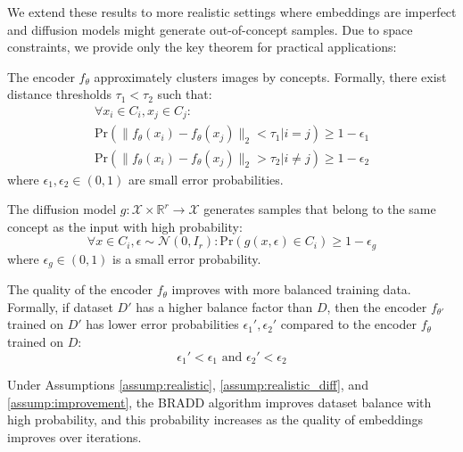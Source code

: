 \noindent
We extend these results to more realistic settings where embeddings are imperfect and diffusion models might generate out-of-concept samples. Due to space constraints, we provide only the key theorem for practical applications:


\begin{assumption}
\label{assump:realistic}
The encoder $f_\theta$ approximately clusters images by concepts. Formally, there exist distance thresholds $\tau_1 < \tau_2$ such that:
\begin{align}
\forall x_i \in C_i, x_j \in C_j: \\
\mathrm{Pr}(\|f_\theta(x_i) - f_\theta(x_j)\|_2 < \tau_1 | i = j) \geq 1 - \epsilon_1 \\
\mathrm{Pr}(\|f_\theta(x_i) - f_\theta(x_j)\|_2 > \tau_2 | i \neq j) \geq 1 - \epsilon_2
\end{align}
where $\epsilon_1, \epsilon_2 \in (0,1)$ are small error probabilities.
\end{assumption}

\begin{assumption}
\label{assump:realistic_diff}
The diffusion model $g: \mathcal{X} \times \mathbb{R}^r \rightarrow \mathcal{X}$ generates samples that belong to the same concept as the input with high probability:
\begin{equation}
\forall x \in C_i, \epsilon \sim \mathcal{N}(0, I_r): \mathrm{Pr}(g(x, \epsilon) \in C_i) \geq 1 - \epsilon_g
\end{equation}
where $\epsilon_g \in (0,1)$ is a small error probability.
\end{assumption}

\begin{assumption}
\label{assump:improvement}
The quality of the encoder $f_\theta$ improves with more balanced training data. Formally, if dataset $D'$ has a higher balance factor than $D$, then the encoder $f_{\theta'}$ trained on $D'$ has lower error probabilities $\epsilon_1', \epsilon_2'$ compared to the encoder $f_\theta$ trained on $D$:
\begin{equation}
\epsilon_1' < \epsilon_1 \text{ and } \epsilon_2' < \epsilon_2
\end{equation}
\end{assumption}

\begin{theorem}
\label{thm:prob}
Under Assumptions \ref{assump:realistic}, \ref{assump:realistic_diff}, and \ref{assump:improvement}, the BRADD algorithm improves dataset balance with high probability, and this probability increases as the quality of embeddings improves over iterations.
\end{theorem}

